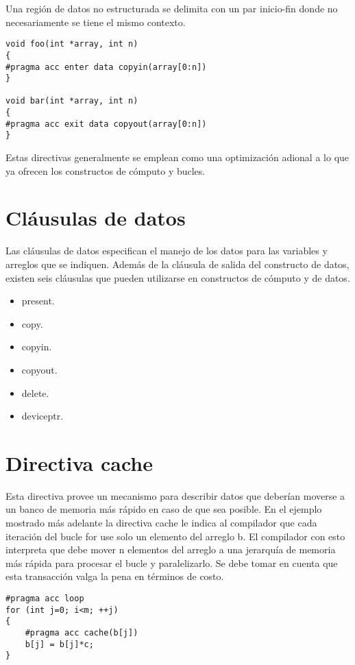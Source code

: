 Una región de datos no estructurada se delimita con un par inicio-fin donde no necesariamente se tiene el mismo contexto.

\begin{lstlisting}[style=CStyle]
void foo(int *array, int n)
{
#pragma acc enter data copyin(array[0:n])
}

void bar(int *array, int n)
{
#pragma acc exit data copyout(array[0:n])
}
\end{lstlisting}

Estas directivas generalmente se emplean como una optimización adional a lo que ya ofrecen los constructos de cómputo y bucles.

\section{Cláusulas de datos}
Las cláusulas de datos especifican el manejo de los datos para las variables y arreglos que se indiquen. Además de la cláusula de salida del constructo de datos, existen seis cláusulas que pueden utilizarse en constructos de cómputo y de datos.

\begin{itemize}
    \item present.
    \item copy.
    \item copyin.
    \item copyout.
    \item delete.
    \item deviceptr.
\end{itemize}

\section{Directiva cache}
Esta directiva provee un mecanismo para describir datos que deberían moverse a un banco de memoria más rápido en caso de que sea posible. En el ejemplo mostrado más adelante la directiva cache le indica al compilador que cada iteración del bucle for use solo un elemento del arreglo b. El compilador con esto interpreta que debe mover n elementos del arreglo a una jerarquía de memoria más rápida para procesar el bucle y paralelizarlo. Se debe tomar en cuenta que esta transacción valga la pena en términos de costo.

\begin{lstlisting}[style=CStyle]
#pragma acc loop
for (int j=0; i<m; ++j)
{
    #pragma acc cache(b[j])
    b[j] = b[j]*c;
}
\end{lstlisting}

\clearpage